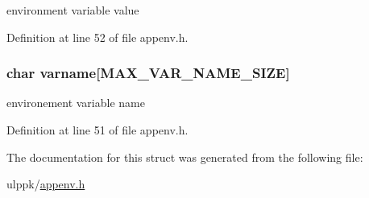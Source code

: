 environment variable value 



Definition at line 52 of file appenv.\-h.

\hypertarget{struct_e_n_v___n_o_d_e_a24342c6b5081fe1693576c6853e11fbe}{
\subsubsection[{varname}]{\setlength{\rightskip}{0pt plus 5cm}char varname\mbox{[}{\bf M\-A\-X\-\_\-\-V\-A\-R\-\_\-\-N\-A\-M\-E\-\_\-\-S\-I\-Z\-E}\mbox{]}}}\label{struct_e_n_v___n_o_d_e_a24342c6b5081fe1693576c6853e11fbe}


environement variable name 



Definition at line 51 of file appenv.\-h.



The documentation for this struct was generated from the following file\-:\begin{DoxyCompactItemize}
\item 
ulppk/\hyperlink{appenv_8h}{appenv.\-h}\end{DoxyCompactItemize}
